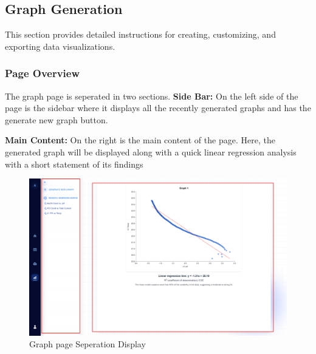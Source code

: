 \documentclass[12pt]{article}
\begin{document}

\subsection{Graph Generation}

This section provides detailed instructions for creating, customizing, and
exporting data visualizations.

\subsubsection{Page Overview}
The graph page is seperated in two sections. 
\newline \newline
\textbf{Side Bar:} \newline
On the left side of the page is the sidebar where it displays all the recently
generated graphs and has the generate new graph button.
\newline\newline

\noindent \textbf{Main Content:}\newline
On the right is the main content of the page. Here, the generated graph will be
displayed along with a quick linear regression analysis with a short statement
of its findings 
\begin{figure}[H]
    \centering
    \includegraphics[scale=0.3]{./Diagrams/graph page .png}
    \caption{Graph page Seperation Display}
    \label{fig:example}
\end{figure}
\end{document}
